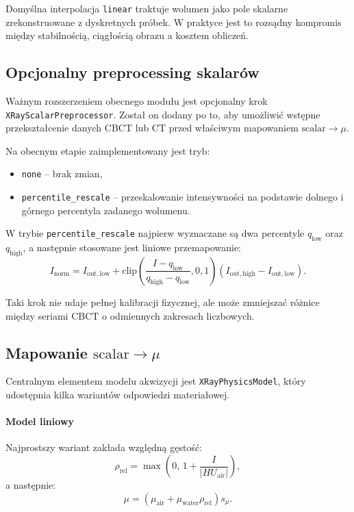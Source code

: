 \documentclass[12pt,a4paper]{article}
\begin{document}
Domyślna interpolacja \texttt{linear} traktuje wolumen jako pole skalarne zrekonstruowane
z dyskretnych próbek. W praktyce jest to rozsądny kompromis między stabilnością,
ciągłością obrazu a kosztem obliczeń.

\subsection{Opcjonalny preprocessing skalarów}

Ważnym rozszerzeniem obecnego modułu jest opcjonalny krok
\texttt{XRayScalarPreprocessor}. Został on dodany po to, aby umożliwić wstępne
przekształcenie danych CBCT lub CT przed właściwym mapowaniem \(\mathrm{scalar}\to\mu\).

Na obecnym etapie zaimplementowany jest tryb:
\begin{itemize}
  \item \texttt{none} -- brak zmian,
  \item \texttt{percentile\_rescale} -- przeskalowanie intensywności na podstawie
        dolnego i górnego percentyla zadanego wolumenu.
\end{itemize}

W trybie \texttt{percentile\_rescale} najpierw wyznaczane są dwa percentyle
\(q_{\mathrm{low}}\) oraz \(q_{\mathrm{high}}\), a następnie stosowane jest
liniowe przemapowanie:
\[
  I_{\mathrm{norm}} =
  I_{\mathrm{out,low}}
  +
  \mathrm{clip}\!\left(
    \frac{I - q_{\mathrm{low}}}{q_{\mathrm{high}} - q_{\mathrm{low}}},
    0,1
  \right)
  \left(I_{\mathrm{out,high}} - I_{\mathrm{out,low}}\right).
\]

Taki krok nie udaje pełnej kalibracji fizycznej, ale może zmniejszać różnice
między seriami CBCT o odmiennych zakresach liczbowych.

\subsection{Mapowanie \(\mathrm{scalar}\rightarrow\mu\)}

Centralnym elementem modelu akwizycji jest \texttt{XRayPhysicsModel}, który
udostępnia kilka wariantów odpowiedzi materiałowej.

\paragraph{Model liniowy}
Najprostszy wariant zakłada względną gęstość:
\[
  \rho_{\mathrm{rel}} =
  \max\!\left(0,\,
  1 + \frac{I}{|HU_{\mathrm{air}}|}\right),
\]
a następnie:
\[
  \mu =
  \left(\mu_{\mathrm{air}} + \mu_{\mathrm{water}}\rho_{\mathrm{rel}}\right)
  s_{\mu}.
\]
\end{document}
